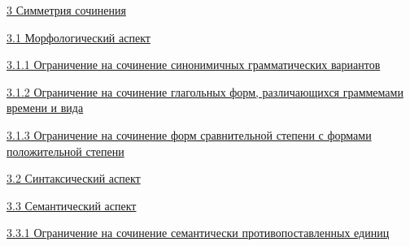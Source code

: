 \protect\hyperlink{ux441ux438ux43cux43cux435ux442ux440ux438ux44f-ux441ux43eux447ux438ux43dux435ux43dux438ux44f}{3
Симметрия сочинения}

\protect\hyperlink{ux43cux43eux440ux444ux43eux43bux43eux433ux438ux447ux435ux441ux43aux438ux439-ux430ux441ux43fux435ux43aux442}{3.1
Морфологический аспект}

\protect\hyperlink{ux43eux433ux440ux430ux43dux438ux447ux435ux43dux438ux435-ux43dux430-ux441ux43eux447ux438ux43dux435ux43dux438ux435-ux441ux438ux43dux43eux43dux438ux43cux438ux447ux43dux44bux445-ux433ux440ux430ux43cux43cux430ux442ux438ux447ux435ux441ux43aux438ux445-ux432ux430ux440ux438ux430ux43dux442ux43eux432}{3.1.1
Ограничение на сочинение синонимичных грамматических вариантов}

\protect\hyperlink{ux43eux433ux440ux430ux43dux438ux447ux435ux43dux438ux435-ux43dux430-ux441ux43eux447ux438ux43dux435ux43dux438ux435-ux433ux43bux430ux433ux43eux43bux44cux43dux44bux445-ux444ux43eux440ux43c-ux440ux430ux437ux43bux438ux447ux430ux44eux449ux438ux445ux441ux44f-ux433ux440ux430ux43cux43cux435ux43cux430ux43cux438-ux432ux440ux435ux43cux435ux43dux438-ux438-ux432ux438ux434ux430}{3.1.2
Ограничение на сочинение глагольных форм, различающихся граммемами
времени и вида}

\protect\hyperlink{ux43eux433ux440ux430ux43dux438ux447ux435ux43dux438ux435-ux43dux430-ux441ux43eux447ux438ux43dux435ux43dux438ux435-ux444ux43eux440ux43c-ux441ux440ux430ux432ux43dux438ux442ux435ux43bux44cux43dux43eux439-ux441ux442ux435ux43fux435ux43dux438-ux441-ux444ux43eux440ux43cux430ux43cux438-ux43fux43eux43bux43eux436ux438ux442ux435ux43bux44cux43dux43eux439-ux441ux442ux435ux43fux435ux43dux438}{3.1.3
Ограничение на сочинение форм сравнительной степени с формами
положительной степени}

\protect\hyperlink{ux441ux438ux43dux442ux430ux43aux441ux438ux447ux435ux441ux43aux438ux439-ux430ux441ux43fux435ux43aux442}{3.2
Синтаксический аспект}

\protect\hyperlink{ux441ux435ux43cux430ux43dux442ux438ux447ux435ux441ux43aux438ux439-ux430ux441ux43fux435ux43aux442}{3.3
Семантический аспект}

\protect\hyperlink{ux43eux433ux440ux430ux43dux438ux447ux435ux43dux438ux435-ux43dux430-ux441ux43eux447ux438ux43dux435ux43dux438ux435-ux441ux435ux43cux430ux43dux442ux438ux447ux435ux441ux43aux438-ux43fux440ux43eux442ux438ux432ux43eux43fux43eux441ux442ux430ux432ux43bux435ux43dux43dux44bux445-ux435ux434ux438ux43dux438ux446}{3.3.1
Ограничение на сочинение семантически противопоставленных единиц}

